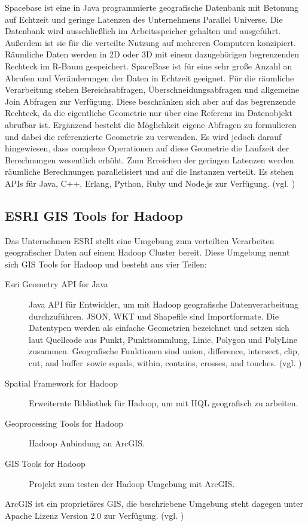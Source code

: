 Spacebase ist eine in Java programmierte geografische Datenbank mit Betonung auf Echtzeit und geringe Latenzen des Unternehmens Parallel Universe.
Die Datenbank wird ausschließlich im Arbeitsspeicher gehalten und ausgeführt.
Außerdem ist sie für die verteilte Nutzung auf mehreren Computern konzipiert.
Räumliche Daten werden in 2D oder 3D mit einem dazugehörigen begrenzenden Rechteck im R-Baum gespeichert.
SpaceBase ist für eine sehr große Anzahl an Abrufen und Veränderungen der Daten in Echtzeit geeignet.
Für die räumliche Verarbeitung stehen Bereichsabfragen, Überschneidungsabfragen und allgemeine Join Abfragen zur Verfügung.
Diese beschränken sich aber auf das begrenzende Rechteck, da die eigentliche Geometrie nur über eine Referenz im Datenobjekt abrufbar ist.
Ergänzend besteht die Möglichkeit eigene Abfragen zu formulieren und dabei die referenzierte Geometrie zu verwenden.
Es wird jedoch darauf hingewiesen, dass complexe Operationen auf diese Geometrie die Laufzeit der Berechnungen wesentlich erhöht.
Zum Erreichen der geringen Latenzen werden räumliche Berechnungen parallelisiert und auf die Instanzen verteilt.
Es stehen APIs für Java, C++, Erlang, Python, Ruby und Node.js zur Verfügung. (vgl. \cite{website:spacebase})


\subsection{ESRI GIS Tools for Hadoop}
Das Unternehmen ESRI stellt eine Umgebung zum verteilten Verarbeiten geografischer Daten auf einem Hadoop Cluster bereit.
Diese Umgebung nennt sich GIS Tools for Hadoop und besteht aus vier Teilen:
\begin{description}
\item[Esri Geometry API for Java] Java API für Entwickler, um mit Hadoop geografische Datenverarbeitung durchzuführen. JSON, WKT und Shapefile sind Importformate. Die Datentypen werden als einfache Geometrien bezeichnet und setzen sich laut Quellcode aus Punkt, Punktsammlung, Linie, Polygon und PolyLine zusammen. Geografische Funktionen sind \glqq union, difference, intersect, clip, cut, and buffer\grqq \ sowie \glqq equals, within, contains, crosses, and touches\grqq . (vgl. \cite{website:esrigishadoopapi})
\item[Spatial Framework for Hadoop] Erweiternte Bibliothek für Hadoop, um mit HQL geografisch zu arbeiten.
\item[Geoprocessing Tools for Hadoop] Hadoop Anbindung an ArcGIS.
\item[GIS Tools for Hadoop] Projekt zum testen der Hadoop Umgebung mit ArcGIS.
\end{description}
ArcGIS ist ein proprietäres GIS, die beschriebene Umgebung steht dagegen unter Apache Lizenz Version 2.0 zur Verfügung. (vgl. \cite{website:esri-hadoop2})

